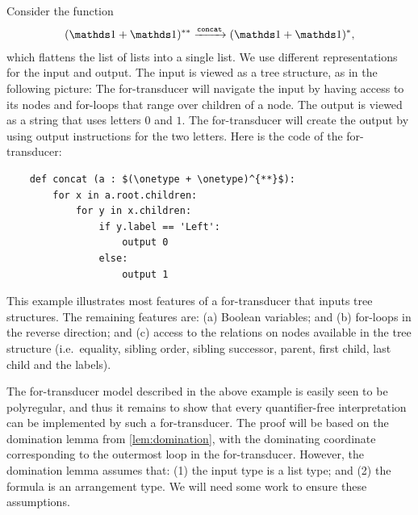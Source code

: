 \begin{myexample}\label{ex:type-to-string-for-transducer}
    Consider the function 
    \begin{align*}
    (\onetype + \onetype)^{**} \xrightarrow \concatterm (\onetype + \onetype)^*,
    \end{align*}
    which flattens the list of lists into a single list.  We use different representations for the input and output. The input is viewed as a tree structure, as in the following picture:
    The for-transducer will navigate the input by having access to its nodes and for-loops that range over children of a node. 
    The output is viewed as a string that uses letters $0$ and $1$. The for-transducer will create the output by using  output instructions for the two letters. Here is the code of the for-transducer:
    \begin{lstlisting}
    def concat (a : $(\onetype + \onetype)^{**}$):
        for x in a.root.children:
            for y in x.children:
                if y.label == 'Left':
                    output 0
                else:
                    output 1
    \end{lstlisting}
    This example illustrates most features of a for-transducer that inputs tree structures. The remaining features are: (a) Boolean variables; and (b) for-loops in the reverse direction; and (c) access  to the relations on nodes available in the tree structure (i.e.~equality, sibling order, sibling successor, parent, first child, last child and the labels).
\end{myexample}

The for-transducer model described in the above example is easily seen to be polyregular, and thus it remains to show that every quantifier-free interpretation can be implemented by such a  for-transducer. 
The proof will be based on the domination lemma from \cref{lem:domination}, with the  dominating coordinate corresponding to  the outermost loop in the for-transducer.
However, the domination lemma  assumes that: (1) the input type is a list type; and (2) the formula is an arrangement type.  We will need some work to ensure these assumptions. 


